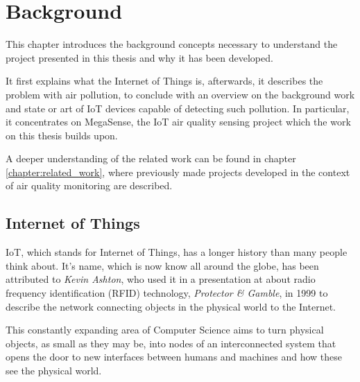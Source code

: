 




\chapter{Background}\label{chapter:background}

	This chapter introduces the background concepts necessary to understand the project presented in this thesis and why it has been developed.
	
	It first explains what the Internet of Things is, afterwards, it describes the problem with air pollution, to conclude with an overview on the background work and state or art of IoT devices capable of detecting such pollution.
	In particular, it concentrates on MegaSense, the IoT air quality sensing project which the work on this thesis builds upon.

	A deeper understanding of the related work can be found in chapter \ref{chapter:related_work}, where previously made projects developed in the context of air quality monitoring are described.

\section{Internet of Things}

	IoT, which stands for Internet of Things, has a longer history than many people think about.
	It's name, which is now know all around the globe, has been attributed to \textit{Kevin Ashton}, who used it in a presentation at about radio frequency identification (RFID) technology, \textit{Protector \& Gamble}, in 1999 \cite{iot_definition} to describe the network connecting objects in the physical world to the Internet.
	
	This constantly expanding area of Computer Science aims to turn physical objects, as small as they may be, into nodes of an interconnected system that opens the door to new interfaces between humans and machines and how these see the physical world.
	

